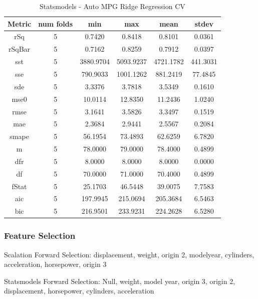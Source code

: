 \documentclass{article}
\begin{document}
\begin{table}[H]
\centering
\caption{Statsmodels - Auto MPG Ridge Regression CV}
\label{tab:Statsmodels - Auto MPG Ridge Regression CV}
\begin{tabular}{|c|c|c|c|c|c|}\hline
Metric & num folds & min & max & mean & stdev \\ \hline \hline
rSq & 5 & 0.7420 & 0.8418 & 0.8101 & 0.0361 \\ \hline
rSqBar & 5 & 0.7162 & 0.8259 & 0.7912 & 0.0397 \\ \hline
sst & 5 & 3880.9704 & 5093.9237 & 4721.1782 & 441.3031 \\ \hline
sse & 5 & 790.9033 & 1001.1262 & 881.2419 & 77.4845 \\ \hline
sde & 5 & 3.3376 & 3.7818 & 3.5349 & 0.1610 \\ \hline
mse0 & 5 & 10.0114 & 12.8350 & 11.2436 & 1.0240 \\ \hline
rmse & 5 & 3.1641 & 3.5826 & 3.3497 & 0.1519 \\ \hline
mae & 5 & 2.3684 & 2.9441 & 2.5567 & 0.2084 \\ \hline
smape & 5 & 56.1954 & 73.4893 & 62.6259 & 6.7820 \\ \hline
m & 5 & 78.0000 & 79.0000 & 78.4000 & 0.4899 \\ \hline
dfr & 5 & 8.0000 & 8.0000 & 8.0000 & 0.0000 \\ \hline
df & 5 & 70.0000 & 71.0000 & 70.4000 & 0.4899 \\ \hline
fStat & 5 & 25.1703 & 46.5448 & 39.0075 & 7.7583 \\ \hline
aic & 5 & 197.9945 & 215.0694 & 205.3684 & 6.5463 \\ \hline
bic & 5 & 216.9501 & 233.9231 & 224.2628 & 6.5280 \\ \hline
\end{tabular}
\end{table}

\subsubsection{Feature Selection}

Scalation Forward Selection: displacement, weight, origin 2, modelyear, cylinders, acceleration, horsepower, origin 3

Statsmodels Forward Selection: Null, weight, model year, origin 3, origin 2, displacement, horsepower, cylinders, acceleration
\end{document}
